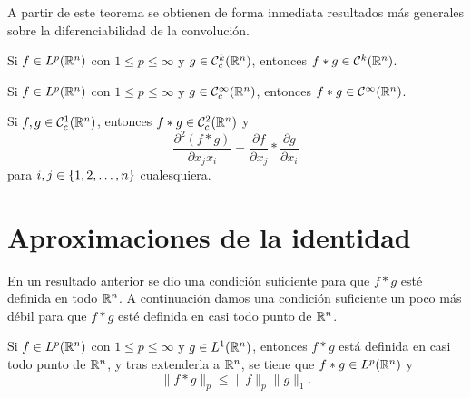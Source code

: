 \documentclass[a4paper, 11pt, oneside]{report}
\begin{document}
A partir de este teorema se obtienen de forma inmediata resultados más generales sobre la diferenciabilidad de la convolución.

\begin{corollary}
  Si $f \in L^p(\mathbb R^n)$ con $1 \leq p \leq \infty$ y $g \in \mathcal{C}^k_c(\mathbb R^n)$, entonces $f \ast g \in \mathcal{C}^k(\mathbb R^n)$.
\end{corollary}

\begin{corollary}\label{cor:2.2.7}
  Si $f \in L^p(\mathbb R^n)$ con $1 \leq p \leq \infty$ y $g \in \mathcal{C}^\infty_c(\mathbb R^n)$, entonces $f \ast g \in \mathcal{C}^\infty(\mathbb R^n)$.
\end{corollary}

\begin{corollary}
  Si $f,g \in \mathcal{C}^1_c(\mathbb R^n)$, entonces $f \ast g \in \mathcal{C}^2_c(\mathbb R^n)$ y
  \[\frac{\partial^2(f \ast g)}{\partial x_j x_i} = \frac{\partial f}{\partial x_j} \ast \frac{\partial g}{\partial x_i}\]
  para $i,j \in \{1,2,\mathellipsis,n\}$ cualesquiera.
\end{corollary}

\section{Aproximaciones de la identidad}

En un resultado anterior se dio una condición suficiente para que $f \ast g$ esté definida en todo $\mathbb R^n$. A continuación damos una condición suficiente un poco más débil para que $f \ast g$ esté definida en casi todo punto de $\mathbb R^n$.

\begin{theorem}\label{teo:2.3.1}
  Si $f \in L^p(\mathbb R^n)$ con $1 \leq p \leq \infty$ y $g \in L^1(\mathbb R^n)$, entonces $f \ast g$ está definida en casi todo punto de $\mathbb R^n$, y tras extenderla a $\mathbb R^n$, se tiene que $f \ast g \in L^p(\mathbb R^n)$ y \[\|f \ast g\|_p  \leq \|f\|_p\|g\|_1.\]
\end{theorem}
\end{document}
